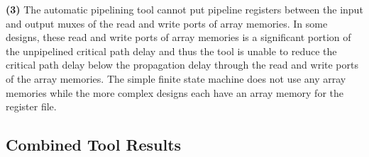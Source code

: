 {\bf (3)} 
The automatic pipelining tool cannot put pipeline registers between the input and output muxes of the read and write ports of array memories. In some designs, these read and write ports of array memories is a significant portion of the unpipelined critical path delay and thus the tool is unable to reduce the critical path delay below the propagation delay through the read and write ports of the array memories. The simple finite state machine does not use any array memories while the more complex designs each have an array memory for the register file.
\subsection{Combined Tool Results}

